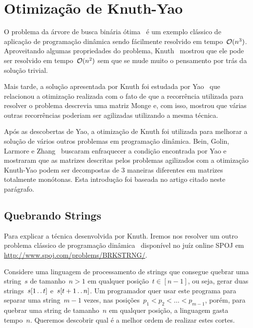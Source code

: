 \section{Otimização de Knuth-Yao}
\label{KY}


O problema da árvore de busca binária ótima~\cite{CLRS} é um exemplo clássico de aplicação de programação dinâmica sendo fácilmente resolvido em tempo~$\mathcal{O}(n^3)$. Aproveitando algumas propriedades do problema, Knuth~\cite{Knuth:1971} mostrou que ele pode ser resolvido em tempo~$\mathcal{O}(n^2)$ sem que se mude muito o pensamento por trás da solução trivial. 

Mais tarde, a solução apresentada por Knuth foi estudada por Yao~\cite{Yao:1980,Yao:1982} que relacionou a otimização realizada com o fato de que a recorrência utilizada para resolver o problema descrevia uma matriz Monge e, com isso, mostrou que várias outras recorrências poderiam ser agilizadas utilizando a mesma técnica.  

Após as descobertas de Yao, a otimização de Knuth foi utilizada para melhorar a solução de vários outros problemas em programação dinâmica. Bein, Golin, Larmore e Zhang~\cite{Bein:2009} buscaram enfraquecer a condição encontrada por Yao e mostraram que as matrizes descritas pelos problemas agilizados com a otimização Knuth-Yao podem ser decompostas de 3 maneiras diferentes em matrizes totalmente monótonas. Esta introdução foi baseada no artigo citado neste parágrafo.


\subsection{Quebrando Strings}

Para explicar a técnica desenvolvida por Knuth. Iremos nos resolver um outro problema clássico de programação dinâmica~\cite[Exercício~15-9]{CLRS} disponível no juíz online SPOJ em \url{http://www.spoj.com/problems/BRKSTRNG/}. 

Considere uma linguagem de processamento de strings que consegue quebrar uma string~$s$ de tamanho~$n > 1$ em qualquer posição~$t \in [n-1]$, ou seja, gerar duas strings~$s[1 \,.\,.\, t]$ e~$s[t+1 \,.\,.\, n]$. Um programador quer usar este programa para separar uma string~$m-1$ vezes, nas posições~$p_1 < p_2 < \dots < p_{m-1}$, porém, para quebrar uma string de tamanho~$n$ em qualquer posição, a linguagem gasta tempo~$n$. Queremos descobrir qual é a melhor ordem de realizar estes cortes. 

